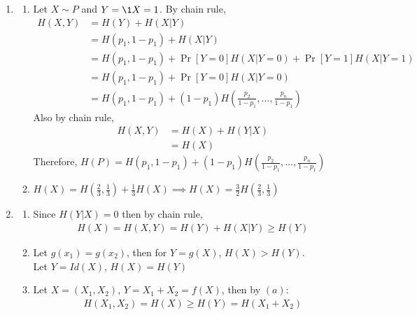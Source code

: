 \documentclass[12pt, a4paper]{article}
\begin{document}
\begin{enumerate}[Q\arabic*.]
  \item 
    \begin{enumerate}
      \item Let $X \sim P$ and $Y = \1{X=1}$. By chain rule,
        \begin{align*}
          H(X,Y) &= H(Y) + H(X | Y)\\
                 &= H(p_1, 1-p_1) + H(X | Y)\tag*{(Entropy of $Y$)}\\ 
                 &= H(p_1, 1-p_1) + \Pr[Y=0]H(X|Y=0) + \Pr[Y=1]H(X|Y=1)\tag*{(Cond.)}\\
                 &= H(p_1, 1-p_1) + \Pr[Y=0]H(X|Y=0)\tag*{($H(X|Y=1)$ has no uncertainty)}\\ 
                 &= H(p_1, 1-p_1) + (1-p_1)H\left(\frac{p_2}{1-p_1}, \dots, \frac{p_n}{1-p_1}\right)
        \end{align*}
        Also by chain rule,
        \begin{align*}
          H(X,Y) &= H(X) + H(Y|X)\\ 
                 &= H(X)\tag*{($H(Y|X)$ has no uncertainty)}
        \end{align*}
        Therefore, $H(P) = H(p_1, 1-p_1) + (1-p_1)H(\frac{p_2}{1-p_1}, \dots, \frac{p_n}{1-p_1})$

      \item $H(X) = H(\frac{2}{3}, \frac{1}{3}) + \frac{1}{3}H(X) \implies H(X) = \frac{3}{2}H(\frac{2}{3}, \frac{1}{3})$ 
      
    \end{enumerate}

  \pagebreak
  \item 
    \begin{enumerate}
      \item Since $H(Y|X) = 0$ then by chain rule,
        \begin{align*}
          H(X) = H(X,Y) = H(Y) + H(X|Y) \geq H(Y)
        \end{align*}

      \item Let $g(x_1) = g(x_2)$, then for $Y = g(X)$, $H(X) > H(Y)$.\\ 
        Let $Y = Id(X)$, $H(X) = H(Y)$

      \item Let $X=(X_1, X_2)$, $Y=X_1+X_2=f(X)$, then by $(a)$:
        \begin{align*}
          H(X_1, X_2) = H(X) \geq H(Y) = H(X_1+X_{2})
        \end{align*}
    \end{enumerate}


\end{enumerate}
\end{document}
